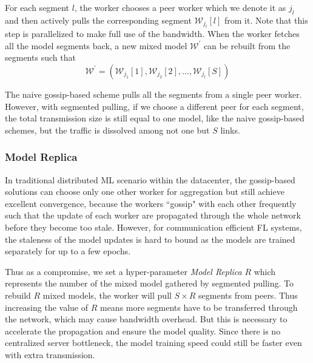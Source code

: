 For each segment $l$, the worker chooses a peer worker which we denote it as $j_l$ and then actively pulls the corresponding segment $\mathcal{W}_{j_l}[l]$ from it. Note that this step is parallelized to make full use of the bandwidth. When the worker fetches all the model segments back, a new mixed model $\mathcal{W}^\prime$ can be rebuilt from the segments such that
\begin{equation}
    \mathcal{W}^\prime = (\mathcal{W}_{j_1}[1],\mathcal{W}_{j_2}[2],\dots,\mathcal{W}_{j_l}[S])
\end{equation}

The naive gossip-based scheme pulls all the segments from a single peer worker. However, with segmented pulling, if we choose a different peer for each segment, the total transmission size is still equal to one model, like the naive gossip-based schemes, but the traffic is dissolved among not one but $S$ links.





\subsubsection{Model Replica}

% 

In traditional distributed ML scenario within the datacenter, the gossip-based solutions can choose only one other worker for aggregation but still achieve excellent convergence, because the workers ``gossip" with each other frequently such that the update of each worker are propagated through the whole network before they become too stale\cite{daily2018gossipgrad:}. However, for communication efficient FL systems, the staleness of the model updates is hard to bound as the models are trained separately for up to a few epochs. 
 

Thus as a compromise, we set a hyper-parameter \textit{Model Replica} $R$ which represents the number of the mixed model gathered by segmented pulling. To rebuild $R$ mixed models, the worker will pull $S \times R$ segments from peers. Thus increasing the value of $R$ means more segments have to be transferred through the network, which may cause bandwidth overhead. But this is necessary to accelerate the propagation and ensure the model quality. Since there is no centralized server bottleneck, the model training speed could still be faster even with extra transmission.


